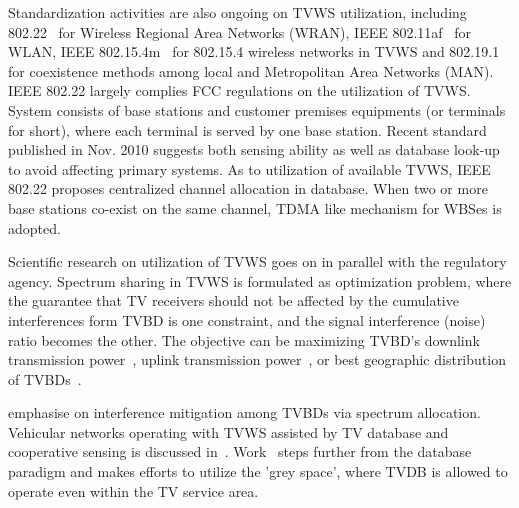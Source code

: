 Standardization activities are also ongoing on TVWS utilization, including 802.22~\cite{802.22} for Wireless Regional Area Networks (WRAN), IEEE 802.11af~\cite{802.11af} for WLAN, IEEE 802.15.4m~\cite{802.15.4m} for 802.15.4 wireless networks in TVWS and 802.19.1~\cite{802.19} for coexistence methods among local and Metropolitan Area Networks (MAN).
IEEE 802.22 largely complies FCC regulations on the utilization of TVWS.
System consists of base stations and customer premises equipments (or terminals for short), where each terminal is served by one base station. 
Recent standard published in Nov. 2010 suggests both sensing ability as well as database look-up to avoid affecting primary systems.
As to utilization of available TVWS, IEEE 802.22 proposes centralized channel allocation in database.
When two or more base stations co-exist on the same channel, TDMA like mechanism for WBSes is adopted.

Scientific research on utilization of TVWS goes on in parallel with the regulatory agency.
Spectrum sharing in TVWS is formulated as optimization problem, where the guarantee that TV receivers should not be affected by the cumulative interferences form TVBD is one constraint, and the signal interference (noise) ratio becomes the other.
The objective can be maximizing TVBD's downlink transmission power~\cite{multipleIntf_pimrc11}, uplink transmission power~\cite{uplink_power_tvws13}, or best geographic distribution of TVBDs~\cite{withinTVcoverage_PIMRC13}.

\cite{game_CA_association_ICDCS12,SA_CA_TVWS_2012crowncom, 802.22co-existence09, 802.22game_08globecom,self-coexistenceWRAN2010infocom} emphasise on interference mitigation among TVBDs via spectrum allocation.
Vehicular networks operating with TVWS assisted by TV database and cooperative sensing is discussed in~\cite{tvws_vtc13}.
Work~\cite{increaseTVWS12} steps further from the database paradigm and makes efforts to utilize the 'grey space', where TVDB is allowed to operate even within the TV service area.

